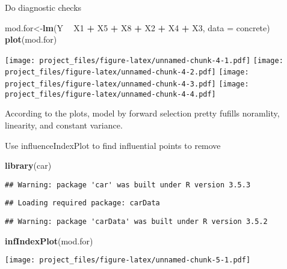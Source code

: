 \documentclass[]{article}
\newenvironment{Shaded}{\begin{snugshade}}{\end{snugshade}}
\newcommand{\KeywordTok}[1]{\textcolor[rgb]{0.13,0.29,0.53}{\textbf{#1}}}
\newcommand{\DataTypeTok}[1]{\textcolor[rgb]{0.13,0.29,0.53}{#1}}
\newcommand{\StringTok}[1]{\textcolor[rgb]{0.31,0.60,0.02}{#1}}
\newcommand{\OperatorTok}[1]{\textcolor[rgb]{0.81,0.36,0.00}{\textbf{#1}}}
\newcommand{\NormalTok}[1]{#1}
\begin{document}
Do diagnostic checks

\begin{Shaded}
\begin{Highlighting}[]
\NormalTok{mod.for<-}\KeywordTok{lm}\NormalTok{(Y }\OperatorTok{~}\StringTok{ }\NormalTok{X1 }\OperatorTok{+}\StringTok{ }\NormalTok{X5 }\OperatorTok{+}\StringTok{ }\NormalTok{X8 }\OperatorTok{+}\StringTok{ }\NormalTok{X2 }\OperatorTok{+}\StringTok{ }\NormalTok{X4 }\OperatorTok{+}\StringTok{ }\NormalTok{X3, }\DataTypeTok{data =}\NormalTok{ concrete)}
\KeywordTok{plot}\NormalTok{(mod.for)}
\end{Highlighting}
\end{Shaded}

\texttt{[image: project\_files/figure-latex/unnamed-chunk-4-1.pdf]}
\texttt{[image: project\_files/figure-latex/unnamed-chunk-4-2.pdf]}
\texttt{[image: project\_files/figure-latex/unnamed-chunk-4-3.pdf]}
\texttt{[image: project\_files/figure-latex/unnamed-chunk-4-4.pdf]}

According to the plots, model by forward selection pretty fufills
noramlity, linearity, and constant variance.

Use influenceIndexPlot to find influential points to remove

\begin{Shaded}
\begin{Highlighting}[]
\KeywordTok{library}\NormalTok{(car)}
\end{Highlighting}
\end{Shaded}

\begin{verbatim}
## Warning: package 'car' was built under R version 3.5.3
\end{verbatim}

\begin{verbatim}
## Loading required package: carData
\end{verbatim}

\begin{verbatim}
## Warning: package 'carData' was built under R version 3.5.2
\end{verbatim}

\begin{Shaded}
\begin{Highlighting}[]
\KeywordTok{infIndexPlot}\NormalTok{(mod.for)}
\end{Highlighting}
\end{Shaded}

\texttt{[image: project\_files/figure-latex/unnamed-chunk-5-1.pdf]}
\end{document}
